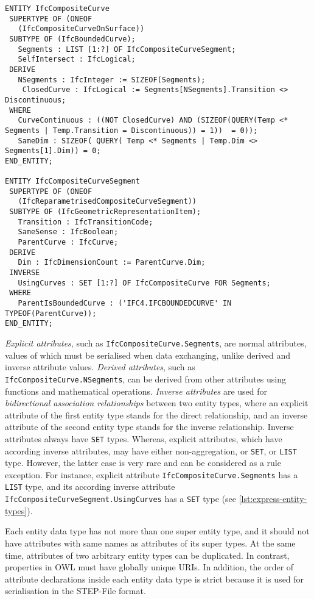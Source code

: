 \begin{lstlisting}[caption={Examples of EXPRESS entity types},label=lst:express-entity-types]
ENTITY IfcCompositeCurve
 SUPERTYPE OF (ONEOF
   (IfcCompositeCurveOnSurface))
 SUBTYPE OF (IfcBoundedCurve);
   Segments : LIST [1:?] OF IfcCompositeCurveSegment;
   SelfIntersect : IfcLogical;
 DERIVE
   NSegments : IfcInteger := SIZEOF(Segments);
	ClosedCurve : IfcLogical := Segments[NSegments].Transition <> Discontinuous;
 WHERE
   CurveContinuous : ((NOT ClosedCurve) AND (SIZEOF(QUERY(Temp <* Segments | Temp.Transition = Discontinuous)) = 1))  = 0));
   SameDim : SIZEOF( QUERY( Temp <* Segments | Temp.Dim <> Segments[1].Dim)) = 0;
END_ENTITY;

ENTITY IfcCompositeCurveSegment
 SUPERTYPE OF (ONEOF
   (IfcReparametrisedCompositeCurveSegment))
 SUBTYPE OF (IfcGeometricRepresentationItem);
   Transition : IfcTransitionCode;
   SameSense : IfcBoolean;
   ParentCurve : IfcCurve;
 DERIVE
   Dim : IfcDimensionCount := ParentCurve.Dim;
 INVERSE
   UsingCurves : SET [1:?] OF IfcCompositeCurve FOR Segments;
 WHERE
   ParentIsBoundedCurve : ('IFC4.IFCBOUNDEDCURVE' IN TYPEOF(ParentCurve));
END_ENTITY;
\end{lstlisting}  


\emph{Explicit attributes}, such as \texttt{Ifc\-Com\-po\-site\-Cur\-ve.Seg\-ments}, are normal attributes, values of which must be serialised when data exchanging, unlike derived and inverse attribute values.
\emph{Derived attributes}, such as \texttt{IfcCompositeCurve.NSegments}, can be derived from other attributes using functions and mathematical operations.
\emph{Inverse attributes} are used for \emph{bidirectional association relationships} between two entity types, where an explicit attribute of the first entity type stands for the direct relationship, and an inverse attribute of the second entity type stands for the inverse relationship.
Inverse attributes always have \texttt{SET} types.
Whereas, explicit attributes, which have according inverse attributes, may have either non-aggregation, or \texttt{SET}, or \texttt{LIST} type.
However, the latter case is very rare and can be considered as a rule exception.
For instance, explicit attribute \texttt{IfcCompositeCurve.Segments} has a \texttt{LIST} type, and its according inverse attribute \texttt{IfcCompositeCurveSegment.UsingCurves} has a \texttt{SET} type (see \autoref{lst:express-entity-types}).


Each entity data type has not more than one super entity type, and it should not have attributes with same names as attributes of its super types.
At the same time, attributes of two arbitrary entity types can be duplicated.
In contrast, properties in OWL must have globally unique URIs.
In addition, the order of attribute declarations inside each entity data type is strict because it is used for serialisation in the STEP-File format.



